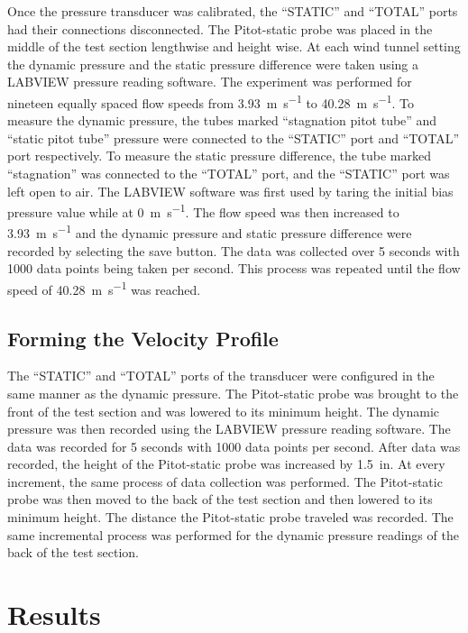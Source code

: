 \documentclass[journal,letterpaper]{IEEEtran}
\begin{document}
Once the pressure transducer was calibrated, the ``STATIC'' and ``TOTAL'' ports had their connections disconnected.
The Pitot-static probe was placed in the middle of the test section lengthwise and height wise.
At each wind tunnel setting the dynamic pressure and the static pressure difference were taken using a LABVIEW pressure reading software.
The experiment was performed for nineteen equally spaced flow speeds from \qty{3.93}{\m\per\s} to \qty{40.28}{\m\per\s}.
To measure the dynamic pressure, the tubes marked ``stagnation pitot tube'' and ``static pitot tube'' pressure were connected to the ``STATIC'' port and ``TOTAL'' port respectively.
To measure the static pressure difference, the tube marked ``stagnation'' was connected to the ``TOTAL'' port, and the ``STATIC'' port was left open to air.
The LABVIEW software was first used by taring the initial bias pressure value while at \qty{0}{\m\per\s}.
The flow speed was then increased to \qty{3.93}{\m\per\s} and the dynamic pressure and static pressure difference were recorded by selecting the save button.
The data was collected over 5 seconds with 1000 data points being taken per second.
This process was repeated until the flow speed of \qty{40.28}{\m\per\s} was reached.

\subsection{Forming the Velocity Profile}

The ``STATIC'' and ``TOTAL'' ports of the transducer were configured in the same manner as the dynamic pressure.
The Pitot-static probe was brought to the front of the test section and was lowered to its minimum height.
The dynamic pressure was then recorded using the LABVIEW pressure reading software.
The data was recorded for 5 seconds with 1000 data points per second.
After data was recorded, the height of the Pitot-static probe was increased by \qty{1.5}{in}.
At every increment, the same process of data collection was performed.
The Pitot-static probe was then moved to the back of the test section and then lowered to its minimum height.
The distance the Pitot-static probe traveled was recorded.
The same incremental process was performed for the dynamic pressure readings of the back of the test section.


\section{Results}
\end{document}
